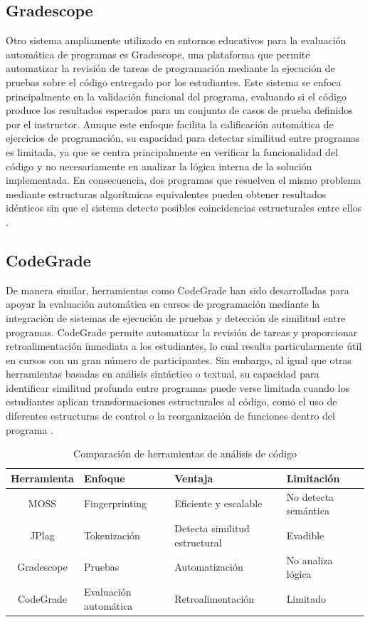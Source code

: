 \subsection{Gradescope}

Otro sistema ampliamente utilizado en entornos educativos para la evaluación automática de programas es Gradescope, una plataforma que permite automatizar la revisión de tareas de programación mediante la ejecución de pruebas sobre el código entregado por los estudiantes. Este sistema se enfoca principalmente en la validación funcional del programa, evaluando si el código produce los resultados esperados para un conjunto de casos de prueba definidos por el instructor. Aunque este enfoque facilita la calificación automática de ejercicios de programación, su capacidad para detectar similitud entre programas es limitada, ya que se centra principalmente en verificar la funcionalidad del código y no necesariamente en analizar la lógica interna de la solución implementada. En consecuencia, dos programas que resuelven el mismo problema mediante estructuras algorítmicas equivalentes pueden obtener resultados idénticos sin que el sistema detecte posibles coincidencias estructurales entre ellos \cite{CodeGrade2023}.

\subsection{CodeGrade}

De manera similar, herramientas como CodeGrade han sido desarrolladas para apoyar la evaluación automática en cursos de programación mediante la integración de sistemas de ejecución de pruebas y detección de similitud entre programas. CodeGrade permite automatizar la revisión de tareas y proporcionar retroalimentación inmediata a los estudiantes, lo cual resulta particularmente útil en cursos con un gran número de participantes. Sin embargo, al igual que otras herramientas basadas en análisis sintáctico o textual, su capacidad para identificar similitud profunda entre programas puede verse limitada cuando los estudiantes aplican transformaciones estructurales al código, como el uso de diferentes estructuras de control o la reorganización de funciones dentro del programa \cite{Cheers2021Robustness}.

\begin{table}[H]
\centering
\begin{tabularx}{\textwidth}{|c|>{\centering\arraybackslash}X|>{\centering\arraybackslash}X|>{\centering\arraybackslash}X|}
\hline
\textbf{Herramienta} & \textbf{Enfoque} & \textbf{Ventaja} & \textbf{Limitación} \\ \hline
MOSS & Fingerprinting & Eficiente y escalable & No detecta semántica \\ \hline
JPlag & Tokenización & Detecta similitud estructural & Evadible \\ \hline
Gradescope & Pruebas & Automatización & No analiza lógica \\ \hline
CodeGrade & Evaluación automática & Retroalimentación & Limitado \\ \hline
\end{tabularx}
\caption{Comparación de herramientas de análisis de código}
\end{table}


